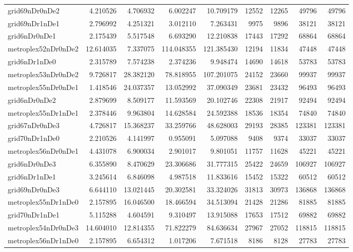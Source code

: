 \begin{longtable}{|l|r|r|r|r|r|r|r|r|}
grid69nDr0nDe2 & 4.210526 & 4.706932 & 6.002247 & 10.709179 & 12552 & 12265 & 49796 & 49796 \\
grid69nDr1nDe1 & 2.796992 & 4.251321 & 3.012110 & 7.263431 & 9975 & 9896 & 38121 & 38121 \\
grid6nDr0nDe1 & 2.175439 & 5.517548 & 6.693290 & 12.210838 & 17443 & 17292 & 68864 & 68864 \\
metroplex52nDr0nDe2 & 12.614035 & 7.337075 & 114.048355 & 121.385430 & 12194 & 11834 & 47448 & 47448 \\
grid6nDr1nDe0 & 2.315789 & 7.574238 & 2.374236 & 9.948474 & 14690 & 14618 & 53783 & 53783 \\
metroplex53nDr0nDe2 & 9.726817 & 28.382120 & 78.818955 & 107.201075 & 24152 & 23660 & 99937 & 99937 \\
metroplex55nDr0nDe1 & 1.418546 & 24.037357 & 13.052992 & 37.090349 & 23681 & 23432 & 96493 & 96493 \\
grid6nDr0nDe2 & 2.879699 & 8.509177 & 11.593569 & 20.102746 & 22308 & 21917 & 92494 & 92494 \\
metroplex55nDr1nDe1 & 2.378446 & 9.963804 & 14.628584 & 24.592388 & 18536 & 18354 & 74840 & 74840 \\
grid67nDr0nDe3 & 4.726817 & 15.368237 & 33.259766 & 48.628003 & 29193 & 28385 & 123381 & 123381 \\
grid70nDr1nDe0 & 2.210526 & 4.141997 & 0.955091 & 5.097088 & 9408 & 9374 & 33037 & 33037 \\
metroplex56nDr0nDe1 & 4.431078 & 6.900034 & 2.901017 & 9.801051 & 11757 & 11628 & 45221 & 45221 \\
grid6nDr0nDe3 & 6.355890 & 8.470629 & 23.306686 & 31.777315 & 25422 & 24659 & 106927 & 106927 \\
grid6nDr1nDe1 & 3.245614 & 6.846098 & 4.987518 & 11.833616 & 15452 & 15322 & 60512 & 60512 \\
grid69nDr0nDe3 & 6.644110 & 13.021445 & 20.302581 & 33.324026 & 31813 & 30973 & 136868 & 136868 \\
metroplex55nDr1nDe0 & 2.157895 & 16.046500 & 18.466594 & 34.513094 & 21428 & 21286 & 81885 & 81885 \\
grid70nDr1nDe1 & 5.115288 & 4.604591 & 9.310497 & 13.915088 & 17653 & 17512 & 69882 & 69882 \\
metroplex54nDr0nDe3 & 14.604010 & 12.814355 & 71.822279 & 84.636634 & 27967 & 27052 & 118815 & 118815 \\
metroplex56nDr1nDe0 & 2.157895 & 6.654312 & 1.017206 & 7.671518 & 8186 & 8128 & 27783 & 27783 \\

\end{longtable}
